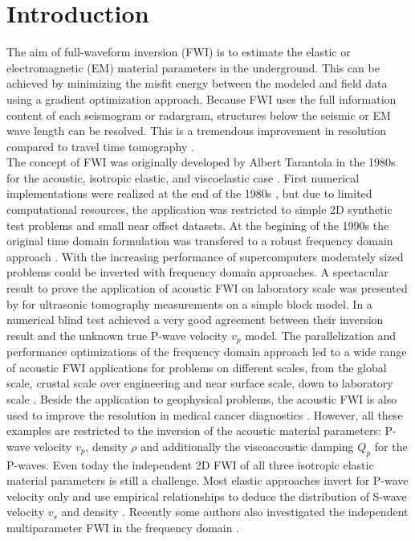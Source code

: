 \documentclass[pdftex,a4paper,parskip,listof=totoc,bibliography=totoc,onehalfspacing,12pt]{scrreprt}
\begin{document}
\chapter*{Introduction}
 
The aim of full-waveform inversion (FWI) is to estimate the elastic or electromagnetic (EM) material parameters in the underground. This can be achieved by minimizing the misfit energy between the modeled and field data using a gradient optimization approach. Because FWI uses the full information content of each seismogram or radargram, structures below the seismic or EM wave length can be resolved. This is a tremendous improvement in resolution compared to travel time tomography \citep{pratt2002the,ernst2007full}. \\
The concept of FWI was originally developed by Albert Tarantola in the 1980s for the acoustic, isotropic elastic, and viscoelastic case \citep{tarantola1984inversion,tarantola1984linearized,tarantola1986a,tarantola1988theoretical}. First numerical implementations were realized at the end of the 1980s \citep{gauthier1986two,mora1987nonlinear,pica1990nonlinear}, but due to limited computational resources, the application was restricted to simple 2D synthetic test problems and small near offset datasets. At the begining of the 1990s the original time domain formulation was transfered to a robust frequency domain approach \citep{pratt1990inverse_a,pratt1990inverse_b}. With the increasing performance of supercomputers moderately sized problems could be inverted with frequency domain approaches. A spectacular result to prove the application of acoustic FWI on laboratory scale was presented by \cite{pratt1999seismic} for ultrasonic tomography measurements on a simple block model. In a numerical blind test \cite{brenders2007full} achieved a very good agreement between their inversion result and the unknown true P-wave velocity $v_p$ model. The parallelization and performance optimizations of the frequency domain approach \citep[see e.g., ][]{sourbier2009fwt2d_a,sourbier2009fwt2d_b} led to a wide range of acoustic FWI applications for problems on different scales, from the global scale, crustal scale over engineering and near surface scale, down to laboratory scale \citep{pratt2004velocity}. Beside the application to geophysical problems, the acoustic FWI is also used to improve the resolution in medical cancer diagnostics \citep{pratt2007sound}. However, all these examples are restricted to the inversion of the acoustic material parameters: P-wave velocity $v_p$, density $\rho$ and additionally the viscoacoustic damping $Q_p$ for the P-waves. Even today the independent 2D FWI of all three isotropic elastic material parameters is still a challenge. Most elastic approaches invert for P-wave velocity only and use empirical relationships to deduce the distribution of S-wave velocity $v_s$ and density \citep{shipp2002two,sheen2006time}. Recently some authors also investigated the independent multiparameter FWI in the frequency domain \citep{choi2008frequency,choi2008two,brossier2009imagerie}.
\end{document}
